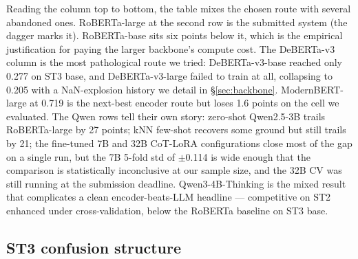 Reading the column top to bottom, the table mixes the chosen route with several abandoned ones. RoBERTa-large at the second row is the submitted system (the dagger marks it). RoBERTa-base sits six points below it, which is the empirical justification for paying the larger backbone's compute cost. The DeBERTa-v3 column is the most pathological route we tried: DeBERTa-v3-base reached only 0.277 on ST3 base, and DeBERTa-v3-large failed to train at all, collapsing to 0.205 with a NaN-explosion history we detail in \S\ref{sec:backbone}. ModernBERT-large at 0.719 is the next-best encoder route but loses 1.6 points on the cell we evaluated. The Qwen rows tell their own story: zero-shot Qwen2.5-3B trails RoBERTa-large by 27 points; kNN few-shot recovers some ground but still trails by 21; the fine-tuned 7B and 32B CoT-LoRA configurations close most of the gap on a single run, but the 7B 5-fold std of $\pm$0.114 is wide enough that the comparison is statistically inconclusive at our sample size, and the 32B CV was still running at the submission deadline. Qwen3-4B-Thinking is the mixed result that complicates a clean encoder-beats-LLM headline --- competitive on ST2 enhanced under cross-validation, below the RoBERTa baseline on ST3 base.

\subsection{ST3 confusion structure}
\label{sec:confusion}

